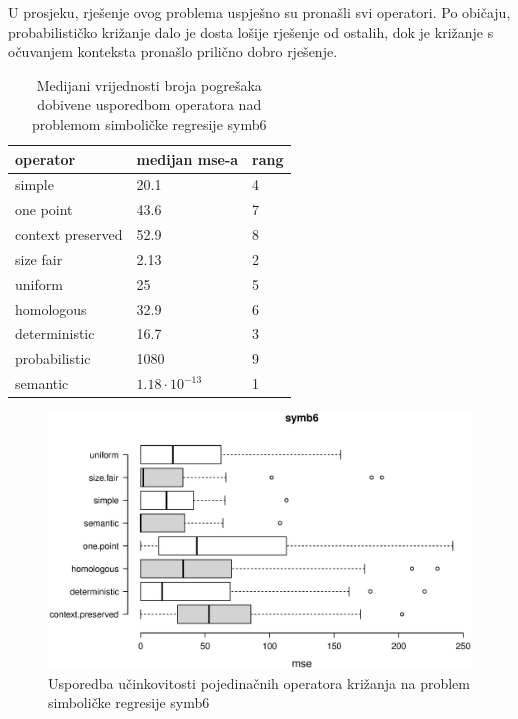 U prosjeku, rješenje ovog problema uspješno su pronašli svi operatori. Po običaju, probabilističko križanje dalo je dosta lošije rješenje od ostalih, dok je križanje s očuvanjem konteksta pronašlo prilično dobro rješenje. 

\begin{table}[H]
 	\centering
    \caption{Medijani vrijednosti broja pogrešaka dobivene usporedbom operatora nad problemom simboličke regresije symb6}
    
    \begin{tabular}{| l | l | l |}
    \hline
    \textbf{operator} & \textbf{medijan mse-a} & \textbf{rang}\\ \hline
    simple & 20.1 & 4\\ \hline
    one point & 43.6 & 7\\ \hline
    context preserved & 52.9 & 8\\ \hline
    size fair & 2.13 & 2\\ \hline
    uniform & 25 & 5\\ \hline
    homologous & 32.9 & 6\\ \hline
    deterministic & 16.7 & 3\\ \hline
    probabilistic & 1080 & 9\\ \hline
    semantic & $1.18 \cdot 10^{-13}$ & 1\\ \hline
    \end{tabular}
    

    \label{symb6table}
\end{table}

\begin{figure}[H]
	\centering
	\includegraphics[trim=0cm 4cm 0cm 0cm, scale=0.5]{./slike/boxPlots/symb6.eps}
	\caption{Usporedba učinkovitosti pojedinačnih operatora križanja na problem simboličke regresije symb6}
	\label{symb6box}
\end{figure}


